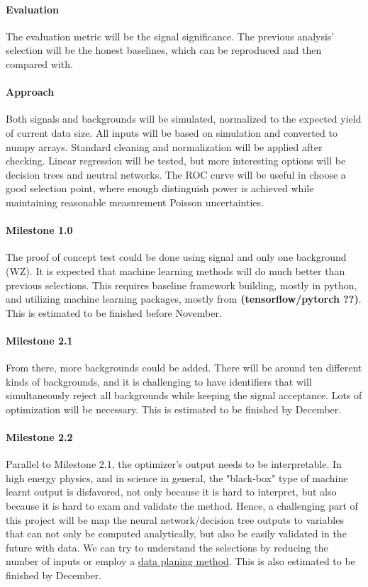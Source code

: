 \documentclass[11pt]{article}
\begin{document}
\paragraph{Evaluation}
The evaluation metric will be the signal significance. The previous analysis' selection will be the honest baselines, which can be reproduced and then compared with. 

\paragraph{Approach}
Both signals and backgrounds will be simulated, normalized to the expected yield of current data size. All inputs will be based on simulation and converted to numpy arrays. Standard cleaning and normalization will be applied after checking. Linear regression will be tested, but more interesting options will be decision trees and neutral networks. The ROC curve will be useful in choose a good selection point, where enough distinguish power is achieved while maintaining reasonable measurement Poisson uncertainties.

\paragraph{Milestone 1.0}
The proof of concept test could be done using signal and only one background (WZ). It is expected that machine learning methods will do much better than previous selections. This requires baseline framework building, mostly in python, and utilizing machine learning packages, mostly from \textbf{(tensorflow/pytorch ??)}. This is estimated to be finished before November.

\paragraph{Milestone 2.1}
From there, more backgrounds could be added. There will be around ten different kinds of backgrounds, and it is challenging to have identifiers that will simultaneously reject all backgrounds while keeping the signal acceptance. Lots of optimization will be necessary. This is estimated to be finished by December.

\paragraph{Milestone 2.2}
Parallel to Milestone 2.1, the optimizer's output needs to be interpretable. In high energy physics, and in science in general, the "black-box" type of machine learnt output is disfavored, not only because it is hard to interpret, but also because it is hard to exam and validate the method. Hence, a challenging part of this project will be map the neural network/decision tree outputs to variables that can not only be computed analytically, but also be easily validated in the future with data. We can try to understand the selections by reducing the number of inputs or employ a \href{https://arxiv.org/pdf/1709.10106.pdf}{data planing method}. This is also estimated to be finished by December.
\end{document}
